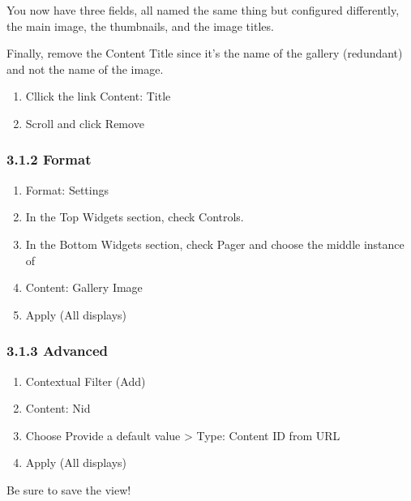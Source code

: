 \documentclass[letterpaper,10pt,english]{sphinxmanual}
\begin{document}
You now have three fields, all named the same thing but configured differently, the main image, the thumbnails, and the image titles.

Finally, remove the Content Title since it's the name of the gallery (redundant) and not the name of the image.
\begin{enumerate}
\item {} 
Cllick the link Content: Title

\item {} 
Scroll and click Remove

\end{enumerate}


\subsubsection{3.1.2 Format}
\label{recipe:format}\begin{enumerate}
\item {} 
Format: Settings

\item {} 
In the Top Widgets section, check Controls.

\item {} 
In the Bottom Widgets section, check Pager and choose the middle instance of

\item {} 
Content: Gallery Image

\item {} 
Apply (All displays)

\end{enumerate}


\subsubsection{3.1.3 Advanced}
\label{recipe:advanced}\begin{enumerate}
\item {} 
Contextual Filter (Add)

\item {} 
Content: Nid

\item {} 
Choose Provide a default value \textgreater{} Type: Content ID from URL

\item {} 
Apply (All displays)

\end{enumerate}

Be sure to save the view!
\end{document}
